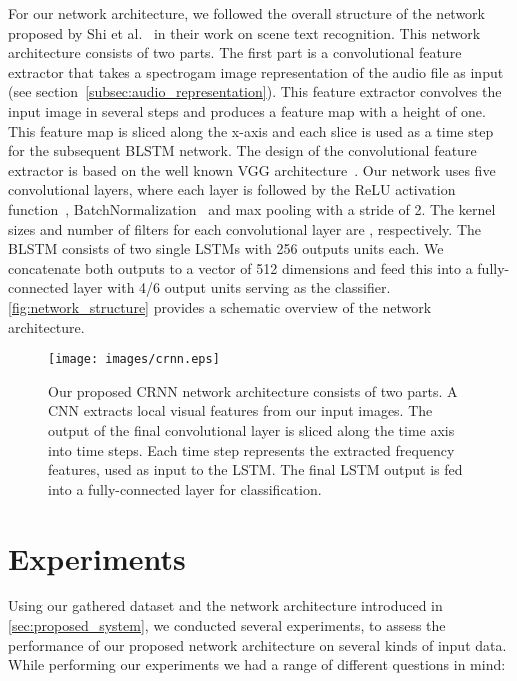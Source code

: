 \documentclass{llncs}
\begin{document}
For our network architecture, we followed the overall structure of the network proposed by Shi et al.~\cite{Shi2016EndToEnd} in their work on scene text recognition.
This network architecture consists of two parts.
The first part is a convolutional feature extractor that takes a spectrogam image representation of the audio file as input (see section~\ref{subsec:audio_representation}).
This feature extractor convolves the input image in several steps and produces a feature map with a height of one.
This feature map is sliced along the x-axis and each slice is used as a time step for the subsequent \ac{BLSTM} network.
The design of the convolutional feature extractor is based on the well known VGG architecture~\cite{Simonyan2015Very}.
Our network uses five convolutional layers, where each layer is followed by the ReLU activation function~\cite{Nair2010Rectified}, BatchNormalization~\cite{Ioffe2015Batcha} and  max pooling with a stride of 2.
The kernel sizes and number of filters for each convolutional layer are , respectively.
The \ac{BLSTM} consists of two single \acp{LSTM} with 256 outputs units each.
We concatenate both outputs to a vector of 512 dimensions and feed this into a fully-connected layer with 4/6 output units serving as the classifier.
\autoref{fig:network_structure} provides a schematic overview of the network architecture.

\begin{figure}[t]
	\texttt{[image: images/crnn.eps]}
	\caption{
		Our proposed CRNN network architecture consists of two parts.
		A CNN extracts local visual features from our input images.
		The output of the final convolutional layer  is sliced along the time axis into  time steps.
		Each time step represents the extracted frequency features, used as input to the LSTM.
		The final LSTM output is fed into a fully-connected layer for classification.}
	\label{fig:network_structure}
\end{figure}
 \section{Experiments}
\label{sec:experiments}

Using our gathered dataset and the network architecture introduced in \autoref{sec:proposed_system}, we conducted several experiments, to assess the performance of our proposed network architecture on several kinds of input data.
While performing our experiments we had a range of different questions in mind:
\end{document}
